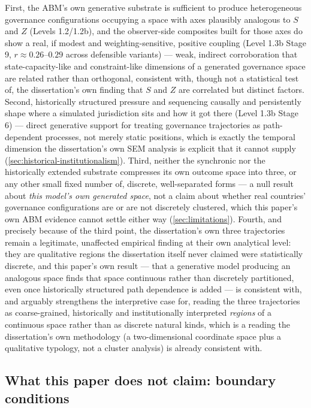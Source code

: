 First, the ABM's own generative substrate is sufficient to produce
heterogeneous governance configurations occupying a space with axes
plausibly analogous to $S$ and $Z$ (Levels 1.2/1.2b), and the observer-side
composites built for those axes do show a real, if modest and
weighting-sensitive, positive coupling (Level 1.3b Stage 9,
$r\approx0.26$--$0.29$ across defensible variants) --- weak, indirect
corroboration that state-capacity-like and constraint-like dimensions of a
generated governance space are related rather than orthogonal, consistent
with, though not a statistical test of, the dissertation's own finding
that $S$ and $Z$ are correlated but distinct factors. Second, historically
structured pressure and sequencing causally and persistently shape where a
simulated jurisdiction sits and how it got there (Level 1.3b Stage 6) ---
direct generative support for treating governance trajectories as
path-dependent processes, not merely static positions, which is exactly
the temporal dimension the dissertation's own SEM analysis is explicit
that it cannot supply (\cref{sec:historical-institutionalism}). Third,
neither the synchronic nor the historically extended substrate compresses
its own outcome space into three, or any other small fixed number of,
discrete, well-separated forms --- a null result about \textit{this
model's own generated space}, not a claim about whether real countries'
governance configurations are or are not discretely clustered, which this
paper's own ABM evidence cannot settle either way (\cref{sec:limitations}).
Fourth, and precisely because of the third point, the dissertation's own
three trajectories remain a legitimate, unaffected empirical finding at
their own analytical level: they are qualitative regions the dissertation
itself never claimed were statistically discrete, and this paper's own
result --- that a generative model producing an analogous space finds that
space continuous rather than discretely partitioned, even once
historically structured path dependence is added --- is consistent with,
and arguably strengthens the interpretive case for, reading the three
trajectories as coarse-grained, historically and institutionally
interpreted \textit{regions} of a continuous space rather than as discrete
natural kinds, which is a reading the dissertation's own methodology
(a two-dimensional coordinate space plus a qualitative typology, not a
cluster analysis) is already consistent with.

\subsection{What this paper does not claim: boundary conditions}
\label{sec:disc-boundary-claims}

